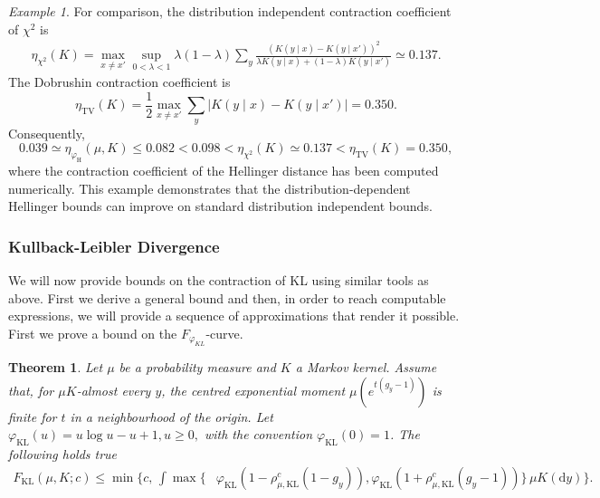 \documentclass[11pt]{article}
\theoremstyle{plain}
\newtheorem{theorem}{Theorem}[section]
\theoremstyle{remark}
\newtheorem{example}{Example}
\begin{document}
\begin{example}
For comparison, the distribution independent contraction coefficient of $\chi^2$ is
\begin{align}
    \eta_{\chi^2}(K)
    =
    \max_{x\neq x'}
    \sup_{0<\lambda<1}
    \lambda(1-\lambda)
    \sum_y
    \frac{
        \left(
            K(y\mid x)-K(y\mid x')
        \right)^2
    }{
        \lambda K(y\mid x)
        +(1-\lambda)K(y\mid x')
    }
    \simeq
    0.137.
\end{align}
The Dobrushin contraction coefficient is
\begin{equation}
    \eta_{\mathrm{TV}}(K)
    =
    \frac{1}{2}
    \max_{x\neq x'}
    \sum_y
    \left|
        K(y\mid x)-K(y\mid x')
    \right|
    =
    0.350.
\end{equation}
Consequently,
\begin{equation}
    0.039 \simeq \eta_{\varphi_{\mathrm H}}(\mu,K)
    \leq
    0.082
    <
    0.098
    <
    \eta_{\chi^2}(K)
    \simeq
    0.137
    <
    \eta_{\mathrm{TV}}(K)
    =
    0.350,
\end{equation}
where the contraction coefficient of the Hellinger distance has been computed numerically. 
This example demonstrates that the distribution-dependent Hellinger
bounds can improve on standard distribution independent bounds.
\end{example}
\subsubsection{Kullback-Leibler Divergence} 
We will now provide bounds on the contraction of KL using similar tools as above. First we derive a general bound and then, in order to reach computable expressions, we will provide a sequence of approximations that render it possible.  First we prove a bound on the $F_{\varphi_{KL}}$-curve.
\begin{theorem}
\label{thm:klNonlinearContraction}
Let $\mu$ be a probability measure and $K$ a Markov kernel. Assume that, for $\mu K$-almost every $y$, the centred exponential
moment $\mu(e^{t(g_y-1)})$ is finite for $t$ in a neighbourhood of the
origin. 
Let $\varphi_{\mathrm{KL}}(u)
    =
    u\log u-u+1, u\geq0,$ with the convention $\varphi_{\mathrm{KL}}(0)=1$. 
    The following holds true \begin{align}
F_{\mathrm{KL}}(\mu,K;c)
\leq
\min\Bigg\{
c,\,
\int
\max\Bigg\{&
\varphi_{\mathrm{KL}}
\left(
1-\rho_{\mu,\mathrm{KL}}^c(1-g_y)
\right),
\varphi_{\mathrm{KL}}
\left(
1+\rho_{\mu,\mathrm{KL}}^c(g_y-1)
\right)
\Bigg\}
\,\mu K(\mathrm dy)
\Bigg\}.
\label{eq:klNonlinearContraction}
\end{align}

\end{theorem}
\end{document}
